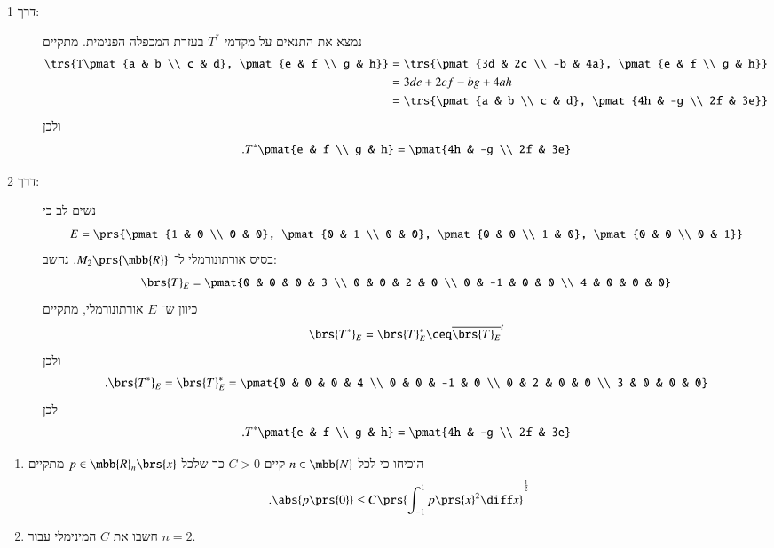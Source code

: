 \documentclass[a4paper,10pt,oneside,openany]{article}
\begin{document}
\begin{solution}
\begin{description}
\item[דרך 1:]
נמצא את התנאים על מקדמי
$T^*$
בעזרת המכפלה הפנימית.
מתקיים
\begin{align*}
\trs{T\pmat{a & b \\ c & d}, \pmat{e & f \\ g & h}} &= \trs{\pmat{3d & 2c \\ -b & 4a}, \pmat{e & f \\ g & h}}
\\&= 3de + 2cf - bg + 4ah
\\&= \trs{\pmat{a & b \\ c & d}, \pmat{4h & -g \\ 2f & 3e}}
\end{align*}
ולכן
\[\text{.} T^*\pmat{e & f \\ g & h} = \pmat{4h & -g \\ 2f & 3e}\]
\item[דרך 2:]
נשים לב כי
\[E = \prs{\pmat{1 & 0 \\ 0 & 0}, \pmat{0 & 1 \\ 0 & 0}, \pmat{0 & 0 \\ 1 & 0}, \pmat{0 & 0 \\ 0 & 1}}\]
בסיס אורתונורמלי ל־%
$M_2\prs{\mbb{R}}$.
נחשב:
\[\brs{T}_E = \pmat{0 & 0 & 0 & 3 \\ 0 & 0 & 2 & 0 \\ 0 & -1 & 0 & 0 \\ 4 & 0 & 0 & 0}\]
כיוון ש־%
$E$
אורתונורמלי, מתקיים
\[\brs{T^*}_E = \brs{T}_E^* \ceq \overline{\brs{T}_E}^t\]
ולכן
\begin{align*}
\text{.} \brs{T^*}_E = \brs{T}_E^* = \pmat{0 & 0 & 0 & 4 \\ 0 & 0 & -1 & 0 \\ 0 & 2 & 0 & 0 \\ 3 & 0 & 0 & 0}
\end{align*}
לכן
\[\text{.} T^*\pmat{e & f \\ g & h} = \pmat{4h & -g \\ 2f & 3e}\]
\end{description}
\end{solution}

\begin{exercise}
\begin{enumerate}
\item הוכיחו כי לכל
$n \in \mbb{N}$
קיים
$C > 0$
כך שלכל
$p \in \mbb{R}_n\brs{x}$
מתקיים
\[\text{.} \abs{p\prs{0}} \leq C \prs{\int_{-1}^1 p\prs{x}^2 \diff x}^{\frac{1}{2}}\]

\item חשבו את
$C$
המינימלי עבור
$n=2$.
\end{enumerate}
\end{exercise}
\end{document}
